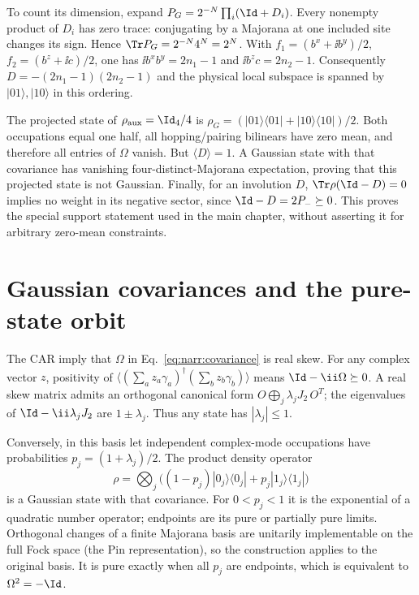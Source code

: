 To count its dimension, expand $P_G=2^{-N}\prod_i(\Id+D_i)$. Every nonempty
product of $D_i$ has zero trace: conjugating by a Majorana at one included site
changes its sign. Hence $\Tr P_G=2^{-N}4^N=2^N$.
With $f_1=(b^x+\ii b^y)/2$, $f_2=(b^z+\ii c)/2$, one has
$\ii b^xb^y=2n_1-1$ and $\ii b^zc=2n_2-1$. Consequently
$D=-(2n_1-1)(2n_2-1)$ and the physical local subspace is spanned by
$|01\rangle,|10\rangle$ in this ordering.

The projected state of $\rho_{\rm aux}=\Id_4/4$ is
$\rho_G=(|01\rangle\langle01|+|10\rangle\langle10|)/2$.
Both occupations equal one half, all hopping/pairing bilinears have zero mean,
and therefore all entries of $\Omega$ vanish. But $\langle D\rangle=1$.
A Gaussian state with that covariance has vanishing four-distinct-Majorana
expectation, proving that this projected state is not Gaussian.
Finally, for an involution $D$,
$\Tr\rho(\Id-D)=0$ implies no weight in its negative sector, since
$\Id-D=2P_-\succeq0$. This proves the special support statement used in the
main chapter, without asserting it for arbitrary zero-mean constraints.

\section{Gaussian covariances and the pure-state orbit}
\label{app:gaussian_proof}
The CAR imply that $\Omega$ in Eq.~\eqref{eq:narr:covariance} is real skew.
For any complex vector $z$, positivity of
$\langle(\sum_a z_a\gamma_a)^\dagger(\sum_bz_b\gamma_b)\rangle$
means $\Id-\ii\Omega\succeq0$. A real skew matrix admits an orthogonal canonical
form $O\bigoplus_j\lambda_jJ_2\,O^T$; the eigenvalues of
$\Id-\ii\lambda_jJ_2$ are $1\pm\lambda_j$. Thus any state has
$|\lambda_j|\leq1$.

Conversely, in this basis let independent complex-mode occupations have
probabilities $p_j=(1+\lambda_j)/2$. The product density operator
\begin{equation}
 \rho=\bigotimes_j\bigl((1-p_j)|0_j\rangle\langle0_j|
                         +p_j|1_j\rangle\langle1_j|\bigr)
\end{equation}
is a Gaussian state with that covariance. For $0<p_j<1$ it is the exponential
of a quadratic number operator; endpoints are its pure or partially pure
limits. Orthogonal changes of a finite Majorana basis are unitarily implementable
on the full Fock space (the Pin representation), so the construction applies
to the original basis. It is pure exactly when all $p_j$ are endpoints, which
is equivalent to $\Omega^2=-\Id$.

